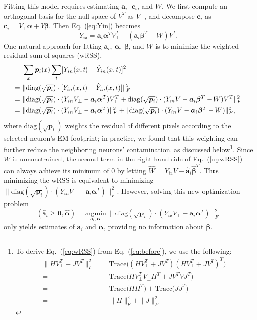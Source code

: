 \documentclass[10pt,letterpaper]{article}
\begin{document}
{Fitting this model requires estimating $\bm{a}_i,~ \bm{c}_i$, and $W$.  We first compute an orthogonal basis for the null space of $V^T$ as $V_{\perp}$, and decompose $\bm{c}_i$ as $\bm{c}_i = V_\perp\bm{\alpha}  +  V\bm{\beta}$. Then Eq. (\ref{eq:Yin}) becomes 
\begin{equation}
	Y_{in} = \bm{a}_i\bm{\alpha}^TV_\perp^T + (\bm{a}_i\bm{\beta}^T + W)V^T.
\end{equation}
One natural approach for fitting $\bm{a}_i, ~\bm{\alpha}, ~\bm{\beta}$, and $W$ is to minimize the weighted residual sum of squares (wRSS),
\begin{align}
	&\sum_x \bm{p}_i(x) \sum_t [Y_{in}(x,t) - \hat Y_{in}(x,t)]^2 \notag\\%
	 = ~ & \|\text{diag}(\sqrt{\bm{p}_i})\cdot [Y_{in}(x,t) - \hat Y_{in}(x,t)]\|_F^2 \notag\\%
	 = ~ &\|\text{diag}(\sqrt{\bm{p}_i})\cdot(Y_{in}V_\perp - \bm{a}_i\bm{\alpha}^T)V_{\perp}^T +\text{diag}(\sqrt{\bm{p}_i}) \cdot (Y_{in}V - \bm{a}_i\bm{\beta}^ T-W)V^T\|_F^2 \label{eq:before}\\
	 = ~ &\|\text{diag}(\sqrt{\bm{p}_i})\cdot(Y_{in}V_\perp - \bm{a}_i\bm{\alpha}^T)\|_F^2 + \|\text{diag}(\sqrt{\bm{p}_i})\cdot(Y_{in}V - \bm{a}_i\bm{\beta}^ T-W)\|_F^2,  \label{eq:wRSS}
\end{align}
where $\text{diag}(\sqrt{\bm{p}_i})$ weights the residual of different pixels according to the selected neuron's EM footprint; in practice, we found that this weighting can further reduce the neighboring neurons' contamination, as discussed below\footnote{ To derive Eq.~(\ref{eq:wRSS}) from Eq.~(\ref{eq:before}), we  use the following: 
\begin{align*}
\|HV_\perp^T + JV^T\|_F^2 = & \text{Trace}\Big((HV_\perp^T + JV^T)(HV_\perp^T + JV^T)^T \Big)\\
= & \text{Trace}\Big(HV_\perp^TV_\perp H^T  + JV^TVJ^T \Big)\\
= & \text{Trace}\Big(HH^T\Big) + \text{Trace}\Big( JJ^T \Big)\\
= & \|H\|_F^2 + \|J\|_F^2
\end{align*}}. Since $W$ is unconstrained, the second term in the right hand side of Eq.~(\ref{eq:wRSS}) can always achieve its minimum of $0$ by letting $\hat{W}=Y_{in}V - \hat{\bm{a}}_i\hat{\bm\beta}^T$. Thus minimizing the wRSS is equivalent to minimizing $\|\text{diag}(\sqrt{\bm{p}_i})\cdot(Y_{in}V_\perp - \bm{a}_i\bm{\alpha}^T)\|_F^2 $. However, solving this new optimization problem
\begin{equation}
 	(\hat{\bm{a}}_i\geq \bm{0}, \hat{\bm{\alpha}}) = \underset{\bm{a}_i, \bm{\alpha}}{\text{argmin}} ~ \|\text{diag}(\sqrt{\bm{p}_i})\cdot (Y_{in}V_\perp - \bm{a}_i\bm{\alpha}^T)\|_F^2 \label{eq:aalpha}
 \end{equation} only yields estimates of $\bm{a}_i$ and $\bm{\alpha}$, providing no information about $\bm{\beta}$. 

}
\end{document}
